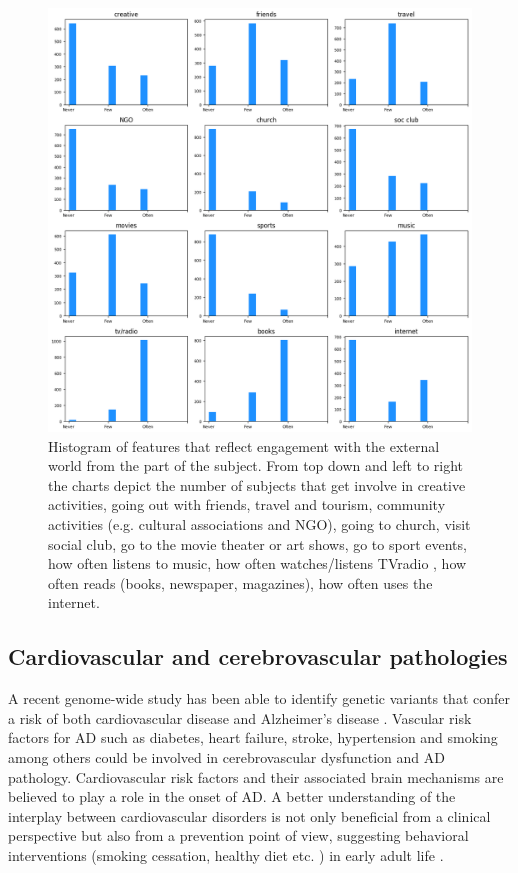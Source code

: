 \documentclass[11pt]{article}
\theoremstyle{definition}
\theoremstyle{remark}
\begin{document}
\begin{figure}[H]
        \centering
        \includegraphics[keepaspectratio, width=\linewidth]{figures/Fig_engage}
        \caption{Histogram of features that reflect engagement with the external world from the part of the subject. From top down and left to right the charts depict the number of subjects that get involve in creative activities, going out with friends, travel and tourism, community activities (e.g. cultural associations and NGO), going to church, visit social club, go to the movie theater or art shows, go to sport events, how often listens to music, how often watches/listens TVradio , how often reads (books, newspaper, magazines), how often uses the internet.} 
        \label{fig:engage}
\end{figure}

\subsection{Cardiovascular and cerebrovascular pathologies}
\label{ssse:cardio}

A recent genome-wide study has been able to identify genetic variants that confer a risk of both cardiovascular disease and Alzheimer's disease \cite{broce2019dissecting}. Vascular risk factors for AD such as diabetes, heart failure, stroke, hypertension and smoking among others could be involved in cerebrovascular dysfunction and AD pathology. Cardiovascular risk factors and their associated brain mechanisms are believed to play a role in the onset of AD. 
A better understanding of the interplay between cardiovascular disorders is not only beneficial from a clinical perspective but also from a prevention point of view, suggesting behavioral interventions (smoking cessation, healthy diet etc. ) in early adult life \cite{de2010cardiac}.  
\end{document}
